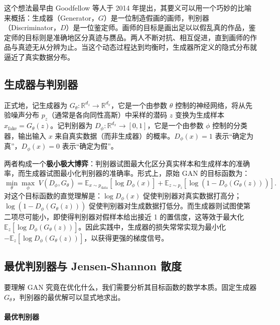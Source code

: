 这个想法最早由 Goodfellow 等人于 2014 年提出\cite{goodfellow2014generativeadversarialnetworks}，其要义可以用一个巧妙的比喻来概括：生成器（Generator，$G$）是一位制造假画的画师，判别器（Discriminator，$D$）是一位鉴定师。画师的目标是画出足以以假乱真的作品，鉴定师的目标则是准确地区分真迹与赝品。两人不断对抗、相互促进，直到画师的作品与真迹无从分辨为止。当这个动态过程达到均衡时，生成器所定义的隐式分布就逼近了真实数据分布。

\subsection{生成器与判别器}

正式地，记生成器为 $G_{\theta}: \mathbb{R}^{d_z} \rightarrow \mathbb{R}^{d_x}$，它是一个由参数 $\theta$ 控制的神经网络，将从先验噪声分布 $p_z$（通常是各向同性高斯）中采样的潜码 $z$ 变换为生成样本 $x_{\text{fake}} = G_{\theta}(z)$。记判别器为 $D_{\phi}: \mathbb{R}^{d_x} \rightarrow [0,1]$，它是一个由参数 $\phi$ 控制的分类器，输出输入 $x$ 来自真实数据（而非生成器）的概率。$D_{\phi}(x) = 1$ 表示“确定为真”，$D_{\phi}(x) = 0$ 表示“确定为假”。

两者构成一个\textbf{极小极大博弈}：判别器试图最大化区分真实样本和生成样本的准确率，而生成器试图最小化判别器的准确率。形式上，原始 GAN 的目标函数为：
\begin{equation}\label{eq:gan_objective}
\min_{\theta} \max_{\phi} \; V(D_{\phi}, G_{\theta}) = \mathbb{E}_{x \sim p_{\text{data}}}[\log D_{\phi}(x)] + \mathbb{E}_{z \sim p_z}[\log(1 - D_{\phi}(G_{\theta}(z)))].
\end{equation}
对这个目标函数的直觉理解是：$\log D_{\phi}(x)$ 促使判别器对真实数据打高分；$\log(1 - D_{\phi}(G_{\theta}(z)))$ 促使判别器对生成数据打低分。而生成器则试图使第二项尽可能小，即使得判别器对假样本给出接近 1 的置信度，这等效于最大化 $\mathbb{E}_{z}[\log D_{\phi}(G_{\theta}(z))]$。因此实践中，生成器的损失常常实现为最小化 $-\mathbb{E}_{z}[\log D_{\phi}(G_{\theta}(z))]$，以获得更强的梯度信号\cite{goodfellow2014generativeadversarialnetworks}。

\subsection{最优判别器与 Jensen-Shannon 散度}

要理解 GAN 究竟在优化什么，我们需要分析其目标函数的数学本质。固定生成器 $G_{\theta}$，判别器的最优解可以显式地求出。

\paragraph{最优判别器}

